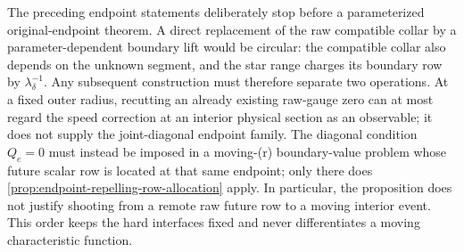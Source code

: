 The preceding endpoint statements deliberately stop before a parameterized
original-endpoint theorem.  A direct replacement of the raw compatible
collar by a parameter-dependent boundary lift would be circular: the
compatible collar also depends on the unknown segment, and the star range
charges its boundary row by \(\lambda_\delta^{-1}\).  Any subsequent
construction must therefore separate two operations.  At a fixed outer
radius, recutting an already existing raw-gauge zero can at most regard the
speed correction at an interior physical section as an observable; it does
not supply the joint-diagonal endpoint family.  The diagonal condition
\(Q_e=0\) must instead be imposed in a moving-(r) boundary-value problem
whose future scalar row is located at that same endpoint; only there does
\cref{prop:endpoint-repelling-row-allocation} apply.  In particular, the
proposition does not justify shooting from a remote raw future row to a
moving interior event.  This order keeps the hard interfaces fixed and
never differentiates a moving characteristic function.

